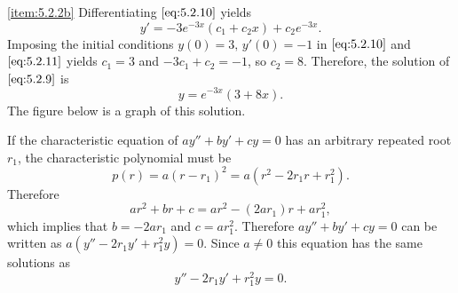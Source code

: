 \documentclass{ximera}
\begin{document}
\begin{example}
\begin{explanation}
\ref{item:5.2.2b}  Differentiating   $\eqref{eq:5.2.10}$ yields
\begin{equation} \label{eq:5.2.11}
y'=-3e^{-3x}(c_1+c_2x)+c_2e^{-3x}.
\end{equation}
Imposing the initial conditions $y(0)=3,\, y'(0)=-1$ in $\eqref{eq:5.2.10}$
and $\eqref{eq:5.2.11}$ yields $c_1=3$ and $-3c_1+c_2=-1$, so
$c_2=8$. Therefore, the solution of $\eqref{eq:5.2.9}$ is
$$
y=e^{-3x}(3+8x).
$$
The figure below is a graph of this solution.

\begin{center}
\end{center}
 
 
\end{explanation}
\end{example}
 
 
 
If the characteristic equation of $ay''+by'+cy=0$
has an arbitrary repeated root $r_1$,  the
characteristic polynomial must be
$$
p(r)=a(r-r_1)^2=a(r^2-2r_1r+r_1^2).
$$
Therefore
$$
ar^2+br+c=ar^2-(2ar_1)r+ar_1^2,
$$
which implies that $b=-2ar_1$ and $c=ar_1^2$.
Therefore
 $ay''+by'+cy=0$ can be written as
$a(y''-2r_1y'+r_1^2y)=0$. Since $a\neq 0$ this equation has the same
solutions as
\begin{equation} \label{eq:5.2.12}
y''-2r_1y'+r_1^2y=0.
\end{equation}
 
\end{document}
